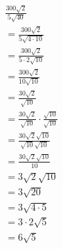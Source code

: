 \begin{align*}
	&\frac{300\sqrt{2}}{5\sqrt{40}}\\[5pt]
	&=\frac{300\sqrt{2}}{5\sqrt{4 \cdot 10}}\\[5pt]
	&=\frac{300\sqrt{2}}{5 \cdot 2\sqrt{10}}\\[5pt]
	&=\frac{300\sqrt{2}}{10\sqrt{10}}\\[5pt]
	&=\frac{30\sqrt{2}}{\sqrt{10}}\\[5pt]
	&=\frac{30\sqrt{2}}{\sqrt{10}} \cdot \frac{\sqrt{10}}{\sqrt{10}}\\[5pt]
	&=\frac{30\sqrt{2}\sqrt{10}}{\sqrt{10}\sqrt{10}}\\[5pt]
	&=\frac{30\sqrt{2}\sqrt{10}}{10}\\[5pt]
	&=3\sqrt{2}\sqrt{10}\\
	&=3\sqrt{20}\\
	&=3\sqrt{4 \cdot 5}\\
	&=3 \cdot 2 \sqrt{5}\\
	&=6\sqrt{5}
\end{align*}
